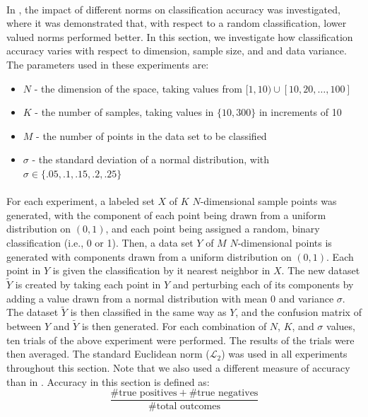 \documentclass{article}
\begin{document}
\paragraph{}
In \cite{aggarwal2001surprising}, the impact of different norms on classification accuracy was investigated, where it was demonstrated that, with respect to a random classification, lower valued norms performed better. In this section, we investigate how classification accuracy varies with respect to dimension, sample size, and and data variance. The parameters used in these experiments are:
\begin{itemize}
\item $N$ - the dimension of the space, taking values from $[1,10)\cup[10,20,\ldots,100]$
\item $K$ - the number of samples, taking values in $\{10,300\}$ in increments of 10
\item $M$ - the number of points in the data set to be classified
\item $\sigma$ - the standard deviation of a normal distribution, with $\sigma\in\{.05,.1,.15,.2,.25\}$
\end{itemize}
\paragraph{}
For each experiment, a labeled set $X$ of $K$ $N$-dimensional sample points was generated, with the component of each point being drawn from a uniform distribution on $(0,1)$, and each point being assigned a random, binary classification (i.e., 0 or 1). Then, a data set $Y$ of $M$ $N$-dimensional points is generated with components drawn  from a uniform distribution on $(0,1)$. Each point in $Y$ is given the classification by it nearest neighbor in $X$. The new dataset $\tilde{Y}$ is created by taking each point in $Y$ and perturbing each of its components by adding a value drawn from a normal distribution with mean $0$ and variance $\sigma$. The dataset $\tilde{Y}$ is then classified in the same way as $Y$, and the confusion matrix of between $Y$ and $\tilde{Y}$ is then generated.
For each combination of $N$, $K$, and $\sigma$ values, ten trials of the above experiment were performed. The results of the trials were then averaged. The standard Euclidean norm ($\mathcal{L}_2$) was used in all experiments throughout this section. Note that we also used a different measure of accuracy than in \cite{aggarwal2001surprising}. Accuracy in this section is defined as:
$$
	\dfrac{\#\textrm{true positives}+\#\textrm{true negatives}}{\#\textrm{total outcomes}}
$$
\end{document}
